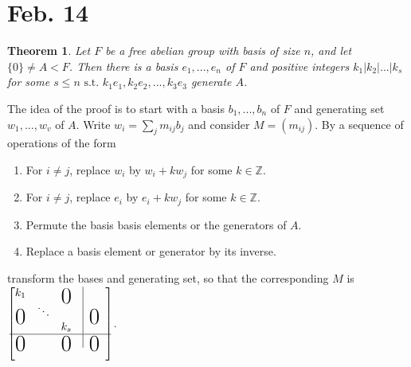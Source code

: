 \documentclass{amsart}
\newtheorem{thm}{Theorem}[section]
\theoremstyle{definition}
\newcommand{\Z}{\mathbb Z}
\newcommand{\st}{\text{ s.t. }}
\newcommand\bigzero{\makebox(0,0){\text{\huge0}}}
\begin{document}
\section{Feb. 14}
\begin{thm}
Let $F$ be a free abelian group with basis of size $n$, and let $\{0\}\not=A<F$. Then there is a basis $e_1,...,e_n$ of $F$ and positive integers $k_1|k_2|...|k_s$ for some $s\leq n\st k_1e_1, k_2e_2,...,k_3e_3$ generate $A$. 
\end{thm}
The idea of the proof is to start with a basis $b_1,...,b_n$ of $F$ and generating set $w_1,...,w_v$ of $A$. Write $w_i=\sum_{j}m_{ij}b_j$ and consider $M=(m_{ij})$. By a sequence of operations of the form
\begin{enumerate}
	\item For $i\not=j$, replace $w_i$ by $w_i+kw_j$ for some $k\in\Z$.
	\item For $i\not=j$, replace $e_i$ by $e_i+kw_j$ for some $k\in\Z$.
	\item Permute the basis basis elements or the generators of $A$.
	\item Replace a basis element or generator by its inverse.
\end{enumerate}
transform the bases and generating set, so that the corresponding $M$ is $\begin{bmatrix}
k_1	& & \bigzero& \vline\\
\bigzero& \ddots& &\vline&\bigzero&\\
&&k_s&\vline\\
\hline
\bigzero&&\bigzero& \vline& \bigzero\\
\\
\end{bmatrix}$.
\end{document}
